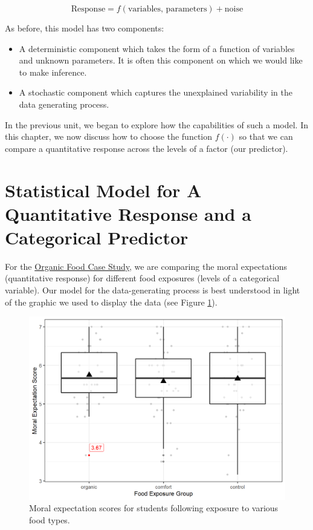 \documentclass[
]{book}
\providecommand{\tightlist}{%
  \setlength{\itemsep}{0pt}\setlength{\parskip}{0pt}}
\theoremstyle{plain}
\theoremstyle{mydefn}
\theoremstyle{myexmpl}
\theoremstyle{remark}
\begin{document}
\[\text{Response} = f(\text{variables, parameters}) + \text{noise}\]

As before, this model has two components:

\begin{itemize}
\tightlist
\item
  A deterministic component which takes the form of a function of variables and unknown parameters. It is often this component on which we would like to make inference.
\item
  A stochastic component which captures the unexplained variability in the data generating process.
\end{itemize}

In the previous unit, we began to explore how the capabilities of such a model. In this chapter, we now discuss how to choose the function \(f(\cdot)\) so that we can compare a quantitative response across the levels of a factor (our predictor).

\hypertarget{statistical-model-for-a-quantitative-response-and-a-categorical-predictor}{%
\section{Statistical Model for A Quantitative Response and a Categorical Predictor}\label{statistical-model-for-a-quantitative-response-and-a-categorical-predictor}}

For the \protect\hyperlink{CaseOrganic}{Organic Food Case Study}, we are comparing the moral expectations (quantitative response) for different food exposures (levels of a categorical variable). Our model for the data-generating process is best understood in light of the graphic we used to display the data (see Figure \ref{fig:anovamodel-organic-plot}).

\begin{figure}

{\centering \includegraphics[width=0.8\linewidth]{./Images/anovamodel-organic-plot-1} 

}

\caption{Moral expectation scores for students following exposure to various food types.}\label{fig:anovamodel-organic-plot}
\end{figure}
\end{document}
